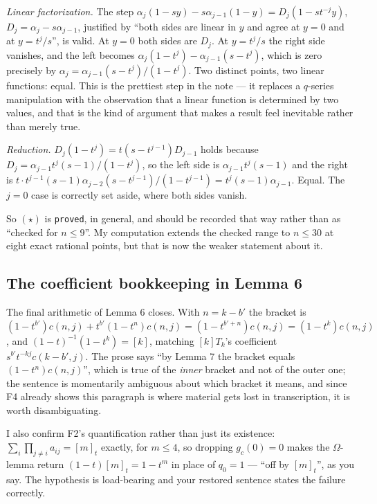 \documentclass[11pt]{article}
\begin{document}
\emph{Linear factorization.} The step
$\alpha_j(1-sy)-s\alpha_{j-1}(1-y)=D_j(1-st^{-j}y)$, $D_j=\alpha_j-s\alpha_{j-1}$,
justified by ``both sides are linear in $y$ and agree at $y=0$ and at $y=t^j/s$'', is valid.
At $y=0$ both sides are $D_j$. At $y=t^j/s$ the right side vanishes, and the left becomes
$\alpha_j(1-t^j)-\alpha_{j-1}(s-t^j)$, which is zero precisely by
$\alpha_j=\alpha_{j-1}(s-t^j)/(1-t^j)$. Two distinct points, two linear functions: equal.
This is the prettiest step in the note --- it replaces a $q$-series manipulation with the
observation that a linear function is determined by two values, and that is the kind of
argument that makes a result feel inevitable rather than merely true.

\emph{Reduction.} $D_j(1-t^j)=t(s-t^{j-1})D_{j-1}$ holds because
$D_j=\alpha_{j-1}t^j(s-1)/(1-t^j)$, so the left side is $\alpha_{j-1}t^j(s-1)$ and the right
is $t\cdot t^{j-1}(s-1)\alpha_{j-2}(s-t^{j-1})/(1-t^{j-1})=t^j(s-1)\alpha_{j-1}$. Equal.
The $j=0$ case is correctly set aside, where both sides vanish.

So $(\star)$ is \texttt{proved}, in general, and should be recorded that way rather than as
``checked for $n\le9$''. My computation extends the checked range to $n\le30$ at eight exact
rational points, but that is now the weaker statement about it.

\subsection*{The coefficient bookkeeping in Lemma 6}

The final arithmetic of Lemma 6 closes. With $n=k-b'$ the bracket is
$(1-t^{b'})c(n,j)+t^{b'}(1-t^n)c(n,j)=(1-t^{b'+n})c(n,j)=(1-t^k)c(n,j)$, and
$(1-t)^{-1}(1-t^{k})=[k]$, matching $[k]T_k$'s coefficient
$s^{b'}t^{-kj}c(k-b',j)$. The prose says ``by Lemma 7 the bracket equals $(1-t^n)c(n,j)$'',
which is true of the \emph{inner} bracket and not of the outer one; the sentence is
momentarily ambiguous about which bracket it means, and since F4 already shows this
paragraph is where material gets lost in transcription, it is worth disambiguating.

I also confirm F2's quantification rather than just its existence: $\sum_i\prod_{j\ne i}a_{ij}=[m]_t$
exactly, for $m\le4$, so dropping $g_c(0)=0$ makes the $\Omega$-lemma return
$(1-t)[m]_t=1-t^m$ in place of $q_0=1$ --- ``off by $[m]_t$'', as you say. The hypothesis is
load-bearing and your restored sentence states the failure correctly.
\end{document}

